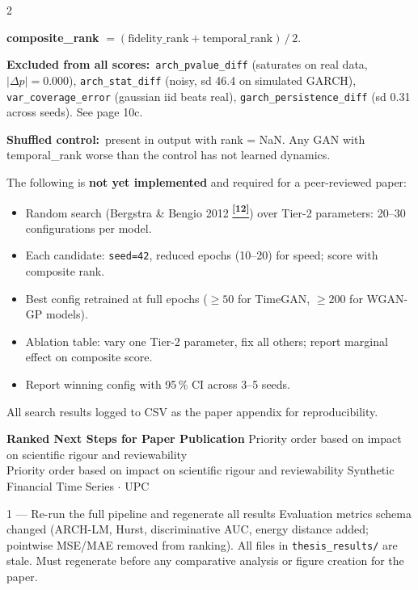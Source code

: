 \documentclass[10pt]{article}
\newcommand{\amberbox}[2]{\begin{tcolorbox}[mybox={Amber}{ABg},title={#1}]#2\end{tcolorbox}}
\newcommand{\pagehead}[2]{%
  \begin{tcolorbox}[enhanced,arc=0pt,outer arc=0pt,boxrule=0pt,
    colback=Navy,colframe=Navy,
    top=5pt,bottom=5pt,left=8pt,right=8pt,
    before skip=0pt,after skip=10pt]
  {\color{white}\large\bfseries #1}%
  \ifx\relax#2\relax\else\\[1pt]{\color{blue!30!white}\small #2}\fi
  \hfill{\color{blue!20!white}\footnotesize Synthetic Financial Time Series $\cdot$ UPC}
  \end{tcolorbox}}
\newcommand{\tcite}[1]{%
  \hyperlink{R:#1}{\textsuperscript{\scriptsize\textbf{[#1]}}}}
\begin{document}
\begin{multicols}{2}
{\smallskip
\textbf{composite\_rank} $= (\text{fidelity\_rank} + \text{temporal\_rank})\,/\,2$.

\smallskip
\textbf{Excluded from all scores:}\ \texttt{arch\_pvalue\_diff} (saturates on real data, $|\Delta p|=0.000$), \texttt{arch\_stat\_diff} (noisy, sd 46.4 on simulated GARCH), \texttt{var\_coverage\_error} (gaussian iid beats real), \texttt{garch\_persistence\_diff} (sd 0.31 across seeds). See page 10c.

\smallskip
\textbf{Shuffled control:}\ present in output with rank = NaN. Any GAN with temporal\_rank worse than the control has not learned dynamics.}

\amberbox{TODO: Systematic Hyperparameter Search for Publication}{%
The following is \textbf{not yet implemented} and required for a peer-reviewed paper:
\begin{itemize}
  \item Random search (Bergstra \& Bengio 2012\tcite{12}) over Tier-2 parameters: 20--30 configurations per model.
  \item Each candidate: \texttt{seed=42}, reduced epochs (10--20) for speed; score with composite rank.
  \item Best config retrained at full epochs ($\geq 50$ for TimeGAN, $\geq 200$ for WGAN-GP models).
  \item Ablation table: vary one Tier-2 parameter, fix all others; report marginal effect on composite score.
  \item Report winning config with 95\,\% CI across 3--5 seeds.
\end{itemize}
All search results logged to CSV as the paper appendix for reproducibility.}

\end{multicols}

\clearpage

\pagehead{Ranked Next Steps for Paper Publication}
         {Priority order based on impact on scientific rigour and reviewability}

\vspace{4pt}
%
  {1 --- Re-run the full pipeline and regenerate all results}%
  {Evaluation metrics schema changed (ARCH-LM, Hurst, discriminative AUC, energy distance added; pointwise MSE/MAE removed from ranking). All files in \texttt{thesis\_results/} are stale. Must regenerate before any comparative analysis or figure creation for the paper.}
\end{document}
